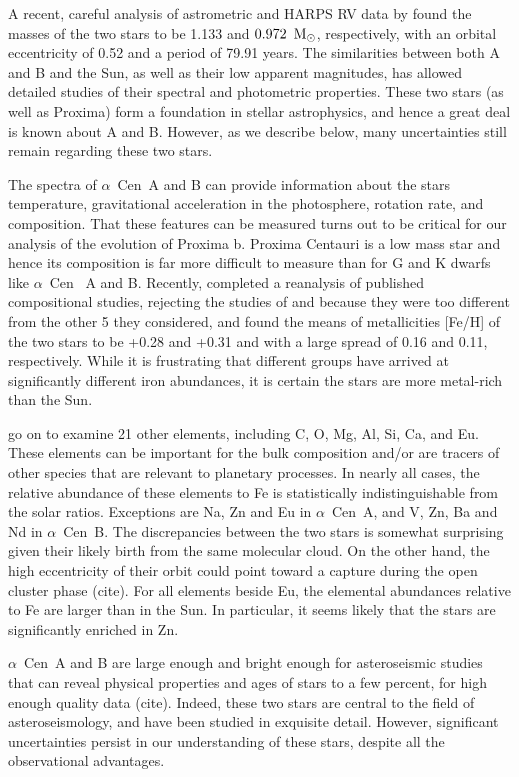 \documentclass[preprint,12pt]{aastex}
\def\msun{{\rm\,M_\odot}}
\def\acen{{$\alpha$~Cen}}
\begin{document}
A recent, careful analysis of astrometric and HARPS RV data by
\cite{PourbaixBoffin16} found the masses of the two stars to be 1.133
and $0.972~\msun$, respectively, with an orbital eccentricity of 0.52
and a period of 79.91 years. The similarities between both A and B and
the Sun, as well as their low apparent magnitudes, has allowed
detailed studies of their spectral and photometric properties. These
two stars (as well as Proxima) form a foundation in stellar astrophysics,
and hence a great deal is known about A and B. However, as we describe
below, many uncertainties still remain regarding these two stars.

The spectra of \acen~A and B can provide information about the stars
temperature, gravitational acceleration in the photosphere, rotation
rate, and composition. That these features can be measured turns out
to be critical for our analysis of the evolution of Proxima b. Proxima
Centauri is a low mass star and hence its composition is far more
difficult to measure than for G and K dwarfs like \acen~ A and
B. Recently, \cite{HinkelKane13} completed a reanalysis of published
compositional studies, rejecting the studies of \citep{Laird85} and
\citep{NeuforgeMagain97} because they were too different from the
other 5 they considered, and found the means of metallicities [Fe/H]
of the two stars to be +0.28 and +0.31 and with a large spread of 0.16
and 0.11, respectively. While it is frustrating that different groups
have arrived at significantly different iron abundances, it is certain
the stars are more metal-rich than the Sun. 

\citep{HinkelKane13} go on to examine 21 other elements, including C,
O, Mg, Al, Si, Ca, and Eu. These elements can be important for the
bulk composition and/or are tracers of other species that are relevant
to planetary processes. In nearly all cases, the relative abundance of
these elements to Fe is statistically indistinguishable from the solar
ratios. Exceptions are Na, Zn and Eu in \acen~A, and V, Zn, Ba
and Nd in \acen~B. The discrepancies between the two stars is
somewhat surprising given their likely birth from the same molecular
cloud. On the other hand, the high eccentricity of their orbit could
point toward a capture during the open cluster phase (cite). For all
elements beside Eu, the elemental abundances relative to Fe are larger
than in the Sun. In particular, it seems likely that the stars are
significantly enriched in Zn.

\acen~A and B are large enough and bright enough for asteroseismic
studies that can reveal physical properties and ages of stars to a few
percent, for high enough quality data (cite). Indeed, these two stars
are central to the field of asteroseismology, and have been studied in
exquisite detail. However, significant uncertainties persist in our
understanding of these stars, despite all the observational
advantages.
\end{document}
